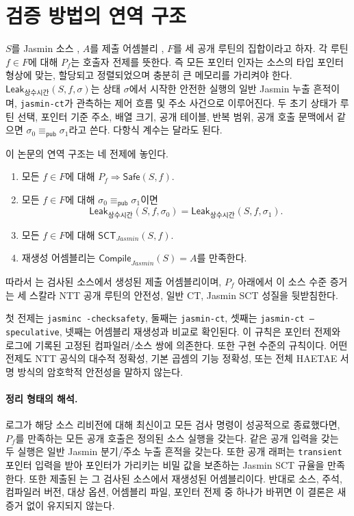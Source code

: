 \documentclass[10pt,twocolumn]{article}
\newcommand{\haetae}{HAETAE}
\newcommand{\jasmin}{Jasmin}
\newcommand{\ct}{상수 시간}
\begin{document}
\section{검증 방법의 연역 구조}

\(S\)를 \jasmin{} 소스 , \(A\)를 제출 어셈블리
, \(F\)를 세 공개 루틴의 집합이라고 하자. 각 루틴
\(f\in F\)에 대해 \(P_f\)는 호출자 전제를 뜻한다. 즉 모든 포인터 인자는
소스의 타입 포인터 형상에 맞는, 할당되고 정렬되었으며 충분히 큰 메모리를
가리켜야 한다. \(\mathsf{Leak}_{\ct{}}(S,f,\sigma)\)는 상태 \(\sigma\)에서
시작한 안전한 실행의 일반 \jasmin{} 누출 흔적이며, \texttt{jasmin-ct}가
관측하는 제어 흐름 및 주소 사건으로 이루어진다. 두 초기 상태가 루틴
선택, 포인터 기준 주소, 배열 크기, 공개 테이블, 반복 범위, 공개 호출
문맥에서 같으면 \(\sigma_0\equiv_{\mathsf{pub}}\sigma_1\)라고 쓴다.
다항식 계수는 달라도 된다.

이 논문의 연역 구조는 네 전제에 놓인다.
\begin{enumerate}
  \item 모든 \(f\in F\)에 대해 \(P_f\Rightarrow \mathsf{Safe}(S,f)\).
  \item 모든 \(f\in F\)에 대해 \(\sigma_0\equiv_{\mathsf{pub}}\sigma_1\)이면
  \[
    \mathsf{Leak}_{\ct{}}(S,f,\sigma_0)=
    \mathsf{Leak}_{\ct{}}(S,f,\sigma_1).
  \]
  \item 모든 \(f\in F\)에 대해 \(\mathsf{SCT}_{\jasmin}(S,f)\).
  \item 재생성 어셈블리는 \(\mathsf{Compile}_{\jasmin}(S)=A\)를 만족한다.
\end{enumerate}
따라서 는 검사된 소스에서 생성된 제출 어셈블리이며,
\(P_f\) 아래에서 이 소스 수준 증거는 세 스칼라 NTT 공개 루틴의 안전성,
일반 CT, \jasmin{} SCT 성질을 뒷받침한다.

첫 전제는 \texttt{jasminc -checksafety}, 둘째는 \texttt{jasmin-ct},
셋째는 \texttt{jasmin-ct --speculative}, 넷째는 어셈블리 재생성과
 비교로 확인된다. 이 규칙은 포인터 전제와 로그에 기록된
고정된 컴파일러/소스 쌍에 의존한다. 또한 구현 수준의 규칙이다. 어떤
전제도 NTT 공식의 대수적 정확성, 기본 곱셈의 기능 정확성, 또는 전체
\haetae{} 서명 방식의 암호학적 안전성을 말하지 않는다.

\paragraph{정리 형태의 해석.}
로그가 해당 소스 리비전에 대해 최신이고 모든 검사 명령이 성공적으로
종료했다면, \(P_f\)를 만족하는 모든 공개 호출은 정의된 소스 실행을
갖는다. 같은 공개 입력을 갖는 두 실행은 일반 \jasmin{} 분기/주소 누출
흔적을 갖는다. 또한 공개 래퍼는 \texttt{transient} 포인터 입력을 받아 포인터가 가리키는 비밀 값을
보존하는 \jasmin{} SCT 규율을 만족한다. 또한 제출된 는 그
검사된 소스에서 재생성된 어셈블리이다. 반대로 소스, 주석, 컴파일러 버전,
대상 옵션, 어셈블리 파일, 포인터 전제 중 하나가 바뀌면 이 결론은 새
증거 없이 유지되지 않는다.
\end{document}
